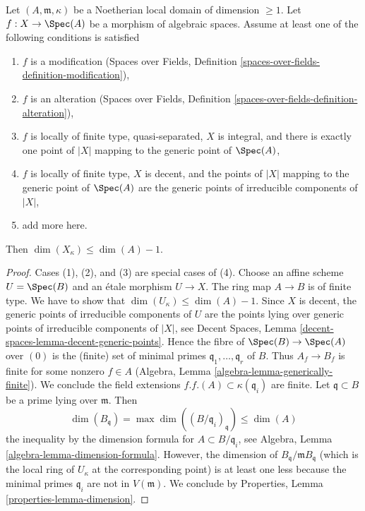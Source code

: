 \begin{lemma}
\label{lemma-dimension-special-fibre}
Let $(A, \mathfrak m, \kappa)$ be a Noetherian local domain
of dimension $\geq 1$.
Let $f : X \to \Spec(A)$ be a morphism of algebraic spaces.
Assume at least one of the following conditions is satisfied
\begin{enumerate}
\item $f$ is a modification (Spaces over Fields, Definition
\ref{spaces-over-fields-definition-modification}),
\item $f$ is an alteration (Spaces over Fields, Definition
\ref{spaces-over-fields-definition-alteration}),
\item $f$ is locally of finite type, quasi-separated, $X$ is integral,
and there is exactly one point of $|X|$ mapping to the generic point
of $\Spec(A)$,
\item $f$ is locally of finite type, $X$ is decent, and the points
of $|X|$ mapping to the generic point of $\Spec(A)$ are
the generic points of irreducible components of $|X|$,
\item add more here.
\end{enumerate}
Then $\dim(X_\kappa) \leq \dim(A) - 1$.
\end{lemma}

\begin{proof}
Cases (1), (2), and (3) are special cases of (4). Choose an affine scheme
$U = \Spec(B)$ and an \'etale morphism $U \to X$. The ring map $A \to B$
is of finite type. We have to show that
$\dim(U_\kappa) \leq \dim(A) - 1$. Since $X$ is decent, the generic
points of irreducible components of $U$ are the points lying over
generic points of irreducible components of $|X|$, see
Decent Spaces, Lemma \ref{decent-spaces-lemma-decent-generic-points}.
Hence the fibre of $\Spec(B) \to \Spec(A)$ over $(0)$
is the (finite) set of minimal primes $\mathfrak q_1, \ldots, \mathfrak q_r$
of $B$. Thus $A_f \to B_f$ is finite for some nonzero $f \in A$
(Algebra, Lemma \ref{algebra-lemma-generically-finite}).
We conclude the field extensions $f.f.(A) \subset \kappa(\mathfrak q_i)$
are finite. Let $\mathfrak q \subset B$ be a prime lying over $\mathfrak m$.
Then
$$
\dim(B_\mathfrak q) = \max \dim((B/\mathfrak q_i)_{\mathfrak q})
\leq \dim(A)
$$
the inequality by the dimension formula for $A \subset B/\mathfrak q_i$, see
Algebra, Lemma \ref{algebra-lemma-dimension-formula}.
However, the dimension of $B_\mathfrak q/\mathfrak m B_\mathfrak q$
(which is the local ring of $U_\kappa$ at the corresponding point)
is at least one less because the minimal primes $\mathfrak q_i$
are not in $V(\mathfrak m)$. We conclude by
Properties, Lemma \ref{properties-lemma-dimension}.
\end{proof}

